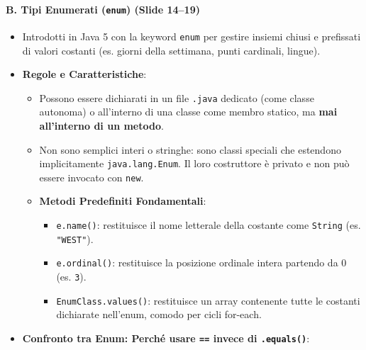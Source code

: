 \documentclass[11pt,a4paper]{article}
\newcommand{\passthrough}[1]{#1}
\providecommand{\tightlist}{\setlength{\itemsep}{0pt}\setlength{\parskip}{0pt}}
\begin{document}
\paragraph{\texorpdfstring{B. Tipi Enumerati (\texttt{enum}) (Slide
14--19)}{B. Tipi Enumerati (enum) (Slide 14--19)}}\label{b.-tipi-enumerati-enum-slide-1419}

\begin{itemize}
\tightlist
\item
  Introdotti in Java 5 con la keyword \passthrough{\lstinline!enum!} per
  gestire insiemi chiusi e prefissati di valori costanti (es. giorni
  della settimana, punti cardinali, lingue).
\item
  \textbf{Regole e Caratteristiche}:

  \begin{itemize}
  \tightlist
  \item
    Possono essere dichiarati in un file \passthrough{\lstinline!.java!}
    dedicato (come classe autonoma) o all'interno di una classe come
    membro statico, ma \textbf{mai all'interno di un metodo}.
  \item
    Non sono semplici interi o stringhe: sono classi speciali che
    estendono implicitamente \passthrough{\lstinline!java.lang.Enum!}.
    Il loro costruttore è privato e non può essere invocato con
    \passthrough{\lstinline!new!}.
  \item
    \textbf{Metodi Predefiniti Fondamentali}:

    \begin{itemize}
    \tightlist
    \item
      \passthrough{\lstinline!e.name()!}: restituisce il nome letterale
      della costante come \passthrough{\lstinline!String!} (es.
      \passthrough{\lstinline!"WEST"!}).
    \item
      \passthrough{\lstinline!e.ordinal()!}: restituisce la posizione
      ordinale intera partendo da 0 (es. \passthrough{\lstinline!3!}).
    \item
      \passthrough{\lstinline!EnumClass.values()!}: restituisce un array
      contenente tutte le costanti dichiarate nell'enum, comodo per
      cicli for-each.
    \end{itemize}
  \end{itemize}
\item
  \textbf{Confronto tra Enum: Perché usare \passthrough{\lstinline!==!}
  invece di \passthrough{\lstinline!.equals()!}}:


\end{itemize}
\end{document}
